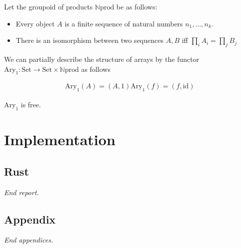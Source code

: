 \documentclass{DIKU-report}
\newcommand\brm[1]{\bm{\mathrm{#1}}}
\newcommand\Nat{\mathbb{N}}
\begin{document}
\begin{definition}
  Let the groupoid of products \(\Nat\brm{prod}\) be as follows:
  \begin{itemize}
    \item Every object \(A\) is a finite sequence of natural numbers \(n_1, \dots, n_k\).
    \item There is an isomorphism between two sequences \(A, B\) iff \(\prod_i A_i = \prod_j B_j\)
  \end{itemize}
\end{definition}

\begin{definition}
  We can partially describe the structure of arrays by the functor
  \(\brm{Ary}_1 : \brm{Set} \to \brm{Set} \times \Nat\brm{prod}\) as follows

  \begin{align*}
    \brm{Ary}_1 (A) = (A, 1)
    \brm{Ary}_1 (f) = (f, \mathrm{id})
  \end{align*}
\end{definition}

\begin{theorem}
  \(\brm{Ary}_1\) is free.
\end{theorem}

\chapter{Implementation}

\section{Rust}

\vfill
\begin{center}\itshape End report.\end{center}
\clearpage

\appendix
\renewcommand\thesection{\Alph{section}}
{}

\section{Appendix}

{}

\vfill
\begin{center}\itshape End appendices.\end{center}
\clearpage

\printbibliography[heading=subbibintoc]
\listoftables
\listoffigures
\printindex
\end{document}

